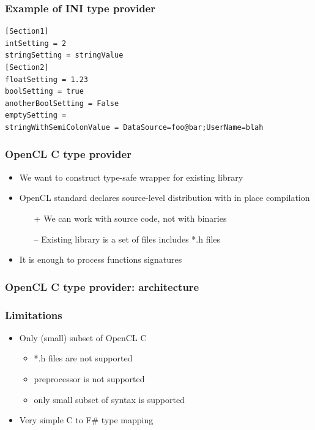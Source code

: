 \documentclass[xcolor=table]{beamer}
\begin{document}
\begin{frame}[fragile]
  \transwipe[direction=90]
  \frametitle{Example of INI type provider}

\small{
\begin{verbatim}
[Section1]
intSetting = 2
stringSetting = stringValue
[Section2]
floatSetting = 1.23
boolSetting = true
anotherBoolSetting = False
emptySetting =
stringWithSemiColonValue = DataSource=foo@bar;UserName=blah 
\end{verbatim}
}

\end{frame}

\begin{frame}
  \transwipe[direction=90]
  \frametitle{OpenCL C type provider}
\begin{itemize}
\item We want to construct type-safe wrapper for existing library
\item OpenCL standard declares source-level distribution with in place compilation
\begin{itemize}
\item[+] We can work with source code, not with binaries
\item[--] Existing library is a set of files includes *.h files
\end{itemize}
\item It is enough to process functions signatures
\end{itemize}
\end{frame}
 
\begin{frame}
  \transwipe[direction=90]
  \frametitle{OpenCL C type provider: architecture}
    
  \pause
\end{frame}

\begin{frame}
  \transwipe[direction=90]
  \frametitle{Limitations}
\begin{itemize}
\item Only (small) subset of OpenCL C
 \begin{itemize}
 \item *.h files are not supported
 \item preprocessor is not supported
 \item only small subset of syntax is supported
  \end{itemize}
\item Very simple C to F\# type mapping
\end{itemize}

\end{frame}
\end{document}
